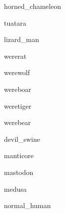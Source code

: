 \documentclass[a4paper,serif]{module}
\begin{document}
\begin{newmonster}{horned_chameleon}\end{newmonster}

\begin{newmonster}{tuatara}\end{newmonster}

\begin{newmonster}{lizard_man}\end{newmonster}


\begin{newmonster}{wererat}\end{newmonster}

\begin{newmonster}{werewolf}\end{newmonster}

\begin{newmonster}{wereboar}\end{newmonster}

\begin{newmonster}{weretiger}\end{newmonster}

\begin{newmonster}{werebear}\end{newmonster}

\begin{newmonster}{devil_swine}\end{newmonster}

\begin{newmonster}{manticore}\end{newmonster}

\begin{newmonster}{mastodon}\end{newmonster}

\begin{newmonster}{medusa}\end{newmonster}


\begin{newmonster}{normal_human}\end{newmonster}
\end{document}
